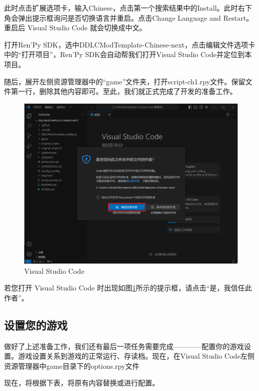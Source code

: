 此时点击扩展选项卡，输入Chinese，点击第一个搜索结果中的Install。此时右下角会弹出提示框询问是否切换语言并重启。点击Change Language and Restart。重启后 Visual Studio Code 就会切换成中文。

打开Ren'Py SDK，选中DDLCModTemplate-Chinese-next，点击编辑文件选项卡中的“打开项目”，Ren'Py SDK会自动帮我们打开Visual Studio Code并定位到本项目。

随后，展开左侧资源管理器中的“game”文件夹，打开script-ch1.rpy文件。保留文件第一行，删除其他内容即可。至此，我们就正式完成了开发的准备工作。

\begin{figure}[htbp]
    \centering
    \includegraphics[scale=.4]{Pictures/2/2.2/2.2.1}
    \caption{Visual Studio Code}
    \label{fig:3.1.2.2}
\end{figure}

\begin{Comment}
    若您打开 Visual Studio Code 时出现如图\ref{fig:3.1.2.2}所示的提示框，请点击“是，我信任此作者”。
\end{Comment}

\subsection{设置您的游戏}
做好了上述准备工作，我们还有最后一项任务需要完成————配置你的游戏设置。游戏设置关系到游戏的正常运行、存读档。现在，在Visual Studio Code左侧资源管理器中game目录下的options.rpy文件

现在，将根据下表，将原有内容替换或进行配置。




